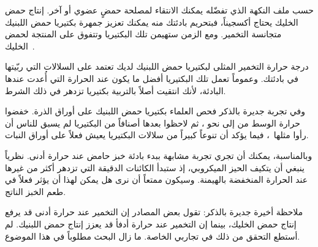حسب ملف النكهة الذي تفضّله يمكنك الانتقاء لمصلحة حمضٍ عضوي أو آخر. إنتاج حمض الخليك يحتاج أكسجيناً، فبتحريم بادئتك منه يمكنك تعزيز جمهرة بكتيريا حمض اللبنيك متجانسة التخمير. ومع الزمن ستهيمن تلك البكتيريا وتتفوق على المنتجة لحمض الخليك~\cite{acetic+acid+oxygen}.

درجة حرارة التخمير المثلى لبكتيريا حمض اللبنيك لديك تعتمد على السلالات التي ربّيتها في بادئتك. وعموماً تعمل تلك البكتيريا أفضل ما يكون عند الحرارة التي أُعدت عندها البادئة، لأنك انتقيت أصلاً بالتربية بكتيريا تزدهر في ذلك الشرط.

وفي تجربة جديرة بالذكر فحص العلماء بكتيريا حمض اللبنيك على أوراق الذرة. خفضوا حرارة الوسط من  إلى نحو ، ثم لاحظوا بعدها أصنافاً من البكتيريا لم يسبق للناس أن رأوا مثلها~\cite{temperature+bacteria+corn}، فيما يؤكد أن تنوعاً كبيراً من سلالات البكتيريا يعيش فعلاً على أوراق النبات.

وبالمناسبة، يمكنك أن تجري تجربة مشابهة ببدء بادئة خبز حامض عند حرارة أدنى. نظرياً ينبغي أن يتكيف الحيز الميكروبي، إذ ستبدأ الكائنات الدقيقة التي تزدهر أكثر من غيرها عند الحرارة المنخفضة بالهيمنة. وسيكون ممتعاً أن نرى هل يمكن لهذا أن يؤثر فعلاً في طعم الخبز الناتج.

ملاحظة أخيرة جديرة بالذكر: تقول بعض المصادر إن التخمير عند حرارة أدنى قد يرفع إنتاج حمض الخليك، بينما إن التخمير عند حرارة أدفأ قد يعزز إنتاج حمض اللبنيك. لم أستطع التحقق من ذلك في تجاربي الخاصة. ما زال البحث مطلوباً في هذا الموضوع.
